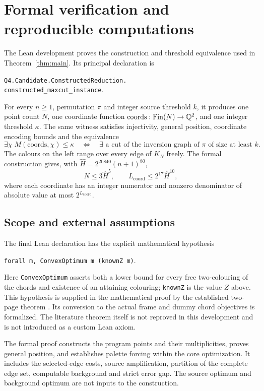 \section{Formal verification and reproducible computations}\label{sec:formalization}

The Lean development proves the construction and threshold equivalence
used in Theorem~\ref{thm:main}. Its principal declaration is
\begin{center}
\texttt{Q4.Candidate.ConstructedReduction.}\\
\texttt{constructed\_maxcut\_instance}.
\end{center}
For every $n\geq1$, permutation $\pi$ and integer source threshold $k$,
it produces one point count $N$, one coordinate function
$\mathrm{coords}:\mathrm{Fin}(N)\to\mathbb Q^2$, and one integer threshold
$\kappa$. The same witness satisfies injectivity, general position,
coordinate encoding bounds and the equivalence
\[
 \exists\chi\;M(\mathrm{coords},\chi)\leq\kappa
 \quad\Longleftrightarrow\quad
 \exists\text{ a cut of the inversion graph of }\pi\text{ of size at least }k.
\]
The colours on the left range over every edge of $K_N$ freely.
The formal construction gives, with
$\widehat H=2^{20840}(n+1)^{80}$,
\[
 N\leq3\widehat H^5,
 \qquad L_{\mathrm{coord}}\leq2^{17}\widehat H^{10},
\]
where each coordinate has an integer numerator and nonzero denominator
of absolute value at most $2^{L_{\mathrm{coord}}}$.

\subsection{Scope and external assumptions}

The final Lean declaration has the explicit mathematical hypothesis
\begin{center}
\texttt{forall m, ConvexOptimum m (knownZ m)}.
\end{center}
Here \texttt{ConvexOptimum} asserts both a lower bound for every free
two-colouring of the chords and existence of an attaining colouring;
\texttt{knownZ} is the value $Z$ above. This hypothesis is supplied in the
mathematical proof by the established two-page theorem
\cite{Abrego2013}. Its conversion to the actual frame and dummy chord
objectives is formalized. The literature theorem itself is not reproved
in this development and is not introduced as a custom Lean axiom.

The formal proof constructs the program points and their multiplicities,
proves general position, and establishes palette forcing within the core
optimization. It includes the selected-edge costs, source amplification,
partition of the complete edge set, computable background and strict
error gap. The source optimum and background optimum are not inputs to
the construction.

